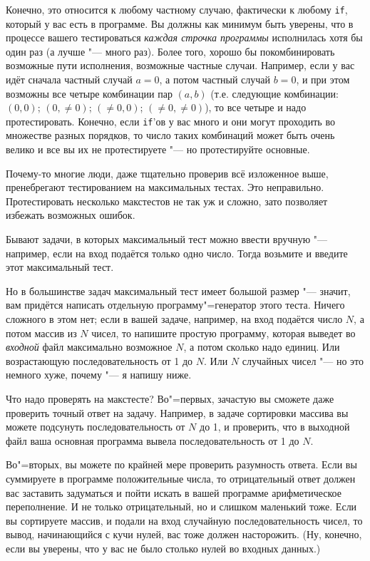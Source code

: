 Конечно, это относится к любому частному случаю, фактически к любому \verb`if`, который у вас есть в программе. 
Вы должны как минимум быть уверены, что в процессе вашего тестироваться \textit{каждая строчка программы} исполнилась хотя бы один раз (а лучше "--- много раз).
Более того, хорошо бы покомбинировать возможные пути исполнения, возможные частные случаи. 
Например, если у вас идёт сначала частный случай $a=0$, а потом частный случай $b=0$, и при этом возможны все четыре комбинации пар $(a,b)$ 
(т.е. следующие комбинации: $(0,0)$; $(0, {\neq} 0)$; $({\neq} 0, 0)$; $({\neq} 0, {\neq} 0)$), то все четыре и надо протестировать.
Конечно, если \verb`if`'ов у вас много и они могут проходить во множестве разных порядков, то число таких комбинаций может быть очень велико
и все вы их не протестируете "--- но протестируйте основные.

Почему-то многие люди, даже тщательно проверив всё изложенное выше, пренебрегают тестированием на максимальных тестах.
Это неправильно. Протестировать несколько макстестов не так уж и сложно, зато позволяет избежать возможных ошибок.

Бывают задачи, в которых максимальный тест можно ввести вручную "--- например, если на вход подаётся только одно число.
Тогда возьмите и введите этот максимальный тест.

Но в большинстве задач максимальный тест имеет большой размер "--- значит, вам придётся написать отдельную программу"=генератор этого теста. 
Ничего сложного в этом нет; если в вашей задаче, например, на вход подаётся число $N$, а потом массив из $N$ чисел, то напишите простую программу,
которая выведет во \textit{входной} файл максимально возможное $N$, а потом сколько надо единиц. 
Или возрастающую последовательность от 1 до $N$. 
Или $N$ случайных чисел "--- но это немного хуже, почему "--- я напишу ниже.

Что надо проверять на макстесте? 
Во"=первых, зачастую вы сможете даже проверить точный ответ на задачу. 
Например, в задаче сортировки массива вы можете подсунуть последовательность от $N$ до 1, и проверить, что в выходной файл ваша основная программа
вывела последовательность от 1 до $N$.

Во"=вторых, вы можете по крайней мере проверить разумность ответа. 
Если вы суммируете в программе положительные числа, то отрицательный ответ должен вас заставить задуматься и пойти искать в вашей программе арифметическое переполнение. И не только отрицательный, но и слишком маленький тоже. Если вы сортируете массив, и подали на вход случайную последовательность чисел, то вывод, начинающийся с кучи нулей, вас тоже должен насторожить. (Ну, конечно, если вы уверены, что у вас не было столько нулей во входных данных.)

